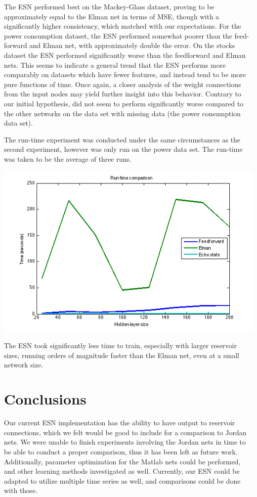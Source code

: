 \documentclass{acm_proc_article-sp}
\begin{document}
The ESN performed best on the Mackey-Glass dataset, proving to be approximately equal to the Elman net in terms of MSE, though with a significantly higher consistency, which matched with our expectations. For the power consumption dataset, the ESN performed somewhat poorer than the feed-forward and Elman net, with approximately double the error. On the stocks dataset the ESN performed significantly worse than the feedforward and Elman nets. This seems to indicate a general trend that the ESN performs more comparably on datasets which have fewer features, and instead tend to be more pure functions of time. Once again, a closer analysis of the weight connections from the input nodes may yield further insight into this behavior. Contrary to our initial hypothesis, did not seem to perform significantly worse compared to the other networks on the data set with missing data (the power consumption data set). 

The run-time experiment was conducted under the same circumstances as the second experiment, however was only run on the power data set. The run-time was taken to be the average of three runs.

\begin{center}
\includegraphics[scale=0.45]{time_plot.png}
\end{center}

The ESN took significantly less time to train, especially with larger reservoir sizes, running orders of magnitude faster than the Elman net, even at a small network size.

\section{Conclusions}
Our current ESN implementation has the ability to have output to reservoir connections, which we felt would be good to include for a comparison to Jordan nets. We were unable to finish experiments involving the Jordan nets in time to be able to conduct a proper comparison, thus it has been left as future work. Additionally, parameter optimization for the Matlab nets could be performed, and other learning methods investigated as well. Currently, our ESN could be adapted to utilize multiple time series as well, and comparisons could be done with those.
\end{document}
